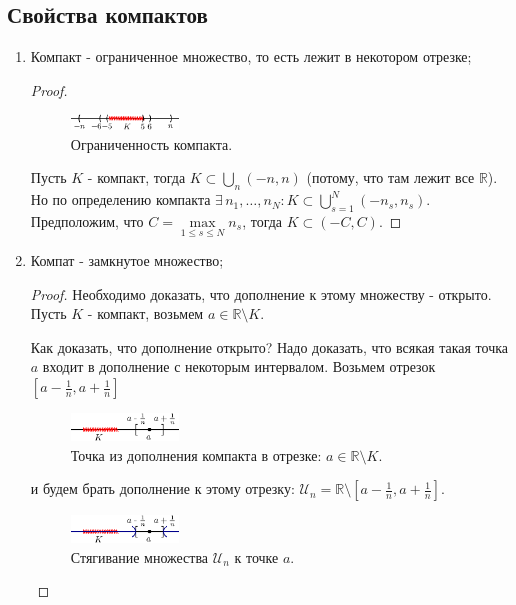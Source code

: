 \documentclass[12pt]{article}
\theoremstyle{definition}
\begin{document}
\subsection*{Свойства компактов}
\begin{enumerate}[label={(\arabic*)}]
	\item Компакт - ограниченное множество, то есть лежит в некотором отрезке;
	\begin{proof}
		\begin{figure}[H]
			\centering
			\includegraphics[width=0.27\textwidth]{13_8.eps}
			\caption{Ограниченность компакта.}
			\label{13_8}
		\end{figure}
		Пусть $K$ - компакт, тогда $K \subset \bigcup\limits_n(-n,n)$ (потому, что там лежит все $\mathbb{R}$). Но по определению компакта $\exists \, n_1, \dotsc, n_N \colon K \subset \bigcup\limits_{s=1}^N(-n_s,n_s)$. Предположим, что $C = \max\limits_{1 \leq s \leq N} n_s$, тогда $K \subset (-C, C)$.
	\end{proof}
	\item Компат - замкнутое множество;
	\begin{proof}
		Необходимо доказать, что дополнение к этому множеству - открыто. Пусть $K$ - компакт, возьмем $a \in \mathbb{R} \setminus K$. 
		
		Как доказать, что дополнение открыто? Надо доказать, что всякая такая точка $a$ входит в дополнение с некоторым интервалом. Возьмем отрезок $[a -\frac{1}{n}, a + \frac{1}{n}]$
		
		\begin{figure}[H]
			\centering
			\includegraphics[width=0.27\textwidth]{13_9.eps}
			\caption{Точка из дополнения компакта в отрезке: $a \in \mathbb{R} \setminus K$.}
			\label{13_9}
		\end{figure}
		 и будем брать дополнение к этому отрезку: $\mathcal{U}_n = \mathbb{R}\setminus [a -\frac{1}{n}, a + \frac{1}{n}]$. 
		
		\begin{figure}[H]
			\centering
			\includegraphics[width=0.27\textwidth]{13_10.eps}
			\caption{Стягивание множества $\mathcal{U}_n$ к точке $a$.}
			\label{13_10}
		\end{figure}
		

\end{proof}
\end{enumerate}
\end{document}
